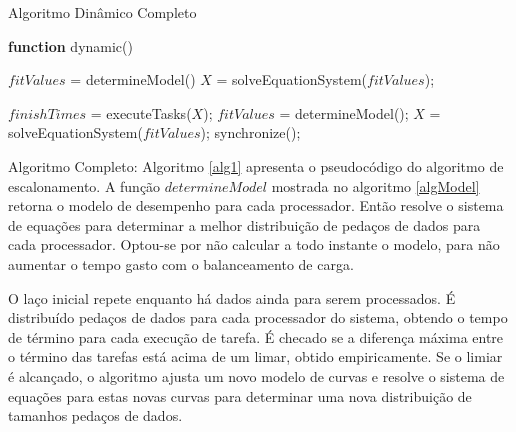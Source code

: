\begin{algorithm}

\caption{Algoritmo Dinâmico Completo}
\label{alg1}

\begin{algorithmic}		

\STATE \textbf{function} dynamic()

\STATE $fitValues$ = determineModel()
\STATE $X$ = solveEquationSystem($fitValues$);


	\STATE $finishTimes$ = executeTasks($X$);
		\STATE $fitValues$ = determineModel();
                \STATE $X$ = solveEquationSystem($fitValues$);
                \STATE synchronize();
    	\ENDIF
\ENDWHILE

\end{algorithmic}
\end{algorithm}

Algoritmo Completo: Algoritmo \ref{alg1} apresenta o pseudocódigo do algoritmo de escalonamento. A função $determineModel$ mostrada no algoritmo \ref{algModel} retorna o modelo de desempenho para cada processador. Então resolve o sistema de equações para determinar a melhor distribuição de pedaços de dados para cada processador. Optou-se por não calcular a todo instante o modelo, para não aumentar o tempo gasto com o balanceamento de carga.

O laço inicial repete enquanto há dados ainda para serem processados. É distribuído pedaços de dados para cada processador do sistema, obtendo o tempo de término para cada execução de tarefa. É checado se a diferença máxima entre o término das tarefas está acima de um limar, obtido empiricamente. Se o limiar é alcançado, o algoritmo ajusta um novo modelo de curvas e resolve o sistema de equações para estas novas curvas para determinar uma nova distribuição de tamanhos pedaços de dados.

 
	










